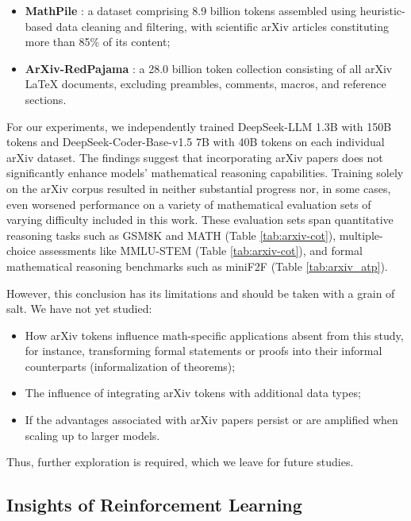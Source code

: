 \begin{itemize}[topsep=0pt]
\begin{itemize}[topsep=0pt]
\begin{itemize}[topsep=0pt]
    \item \textbf{MathPile} \citep{mathpile}: a dataset comprising 8.9 billion tokens assembled using heuristic-based data cleaning and filtering, with scientific arXiv articles constituting more than 85\% of its content;
    \item \textbf{ArXiv-RedPajama} \citep{redpajama}: a 28.0 billion token collection consisting of all arXiv LaTeX documents, excluding preambles, comments, macros, and reference sections.
\end{itemize}

For our experiments, we independently trained DeepSeek-LLM 1.3B with 150B tokens and DeepSeek-Coder-Base-v1.5 7B with 40B tokens on each individual arXiv dataset. The findings suggest that incorporating arXiv papers does not significantly enhance models' mathematical reasoning capabilities. Training solely on the arXiv corpus resulted in neither substantial progress nor, in some cases, even worsened performance on a variety of mathematical evaluation sets of varying difficulty included in this work. These evaluation sets span quantitative reasoning tasks such as GSM8K and MATH (Table \ref{tab:arxiv-cot}), multiple-choice assessments like MMLU-STEM (Table \ref{tab:arxiv-cot}), and formal mathematical reasoning benchmarks such as miniF2F (Table \ref{tab:arxiv_atp}).

However, this conclusion has its limitations and should be taken with a grain of salt. We have not yet studied:

\begin{itemize}[topsep=0pt]
    \item How arXiv tokens influence math-specific applications absent from this study, for instance, transforming formal statements or proofs into their informal counterparts (informalization of theorems);
    \item The influence of integrating arXiv tokens with additional data types;
    \item If the advantages associated with arXiv papers persist or are amplified when scaling up to larger models.
\end{itemize}

Thus, further exploration is required, which we leave for future studies.

\subsection{Insights of Reinforcement Learning}

\end{itemize}
\end{itemize}
